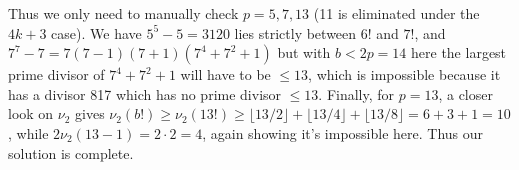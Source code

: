 \documentclass[11pt,a4paper]{article}
\begin{document}
\begin{enumerate}
        Thus we only need to manually check $p=5, 7, 13$ (11 is eliminated under the $4k+3$ case). 
        We have $5^5-5=3120$ lies strictly between $6!$ and $7!$, 
        and $7^7-7=7(7-1)(7+1)(7^4+7^2+1)$ but with $b<2p=14$ here the largest prime divisor of $7^4+7^2+1$ will have to be $\le 13$, 
        which is impossible because it has a divisor 817 which has no prime divisor $\le 13$. 
        Finally, for $p=13$, a closer look on $\nu_2$ gives 
        $\nu_2(b!)\ge \nu_2(13!)\ge \lfloor 13/2\rfloor+\lfloor 13/4\rfloor+\lfloor 13/8\rfloor = 6 + 3 + 1 = 10$, 
        while $2\nu_2(13-1)=2\cdot 2 = 4$, again showing it's impossible here. 
        Thus our solution is complete. 
        
    \end{enumerate}
\end{document}
